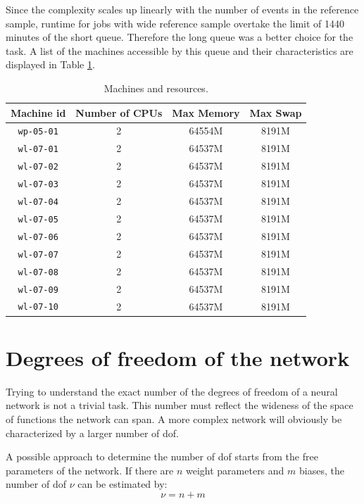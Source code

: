 \noindent
Since the complexity scales up linearly with the number of events in the reference sample, runtime for jobs with wide reference sample overtake the limit of 1440 minutes of the short queue. Therefore the long queue was a better choice for the task. A list of the machines accessible by this queue and their characteristics are displayed in Table \ref{tab:LONG_QUEUE_MACHINES}.

\begin{table}[H]
	\centering
	\begin{tabular}{c c c c}
	\toprule
	Machine id	&	Number of CPUs	&	Max Memory		&	Max Swap	\\
	\midrule
	\texttt{wp-05-01}	&	2	&	64554M  &	8191M	\\
	\texttt{wl-07-01}	&	2	&	64537M  &	8191M	\\
	\texttt{wl-07-02}	&	2	&	64537M  &	8191M	\\
	\texttt{wl-07-03}	&	2	&	64537M  &	8191M	\\
	\texttt{wl-07-04}	&	2	&	64537M  &	8191M	\\
	\texttt{wl-07-05}	&	2	&	64537M  &	8191M	\\
	\texttt{wl-07-06}	&	2	&	64537M  &	8191M	\\
	\texttt{wl-07-07}	&	2	&	64537M  &	8191M	\\
	\texttt{wl-07-08}	&	2	&	64537M  &	8191M	\\
	\texttt{wl-07-09}	&	2	&	64537M  &	8191M	\\
	\texttt{wl-07-10}	&	2	&	64537M  &	8191M	\\
	\bottomrule
	\end{tabular}
	\caption{Machines and resources.}
	\label{tab:LONG_QUEUE_MACHINES}
\end{table}





\section{Degrees of freedom of the network}
Trying to understand the exact number of the degrees of freedom of a neural network is not a trivial task. This number must reflect the wideness of the space of functions the network can span. A more complex network will obviously be characterized by a larger number of dof.

A possible approach to determine the number of dof starts from the free parameters of the network. If there are $n$ weight parameters and $m$ biases, the number of dof $\nu$ can be estimated by:
\begin{equation}
	\nu = n + m
\end{equation}

